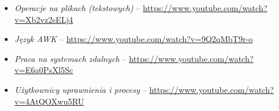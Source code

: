 % 
% 
% 
% 

\begin{itemize}
\item \emph{Operacje na plikach (tekstowych)} – \url{https://www.youtube.com/watch?v=Xb2vz2sELj4}
\item \emph{Język AWK} – \url{https://www.youtube.com/watch?v=9Q2qMbT9r-o}
\item \emph{Praca na systemach zdalnych} – \url{https://www.youtube.com/watch?v=E6a0PsXl5Sc}
\item \emph{Użytkownicy uprawnienia i procesy} – \url{https://www.youtube.com/watch?v=4AtQOXwu5RU}
\end{itemize}
